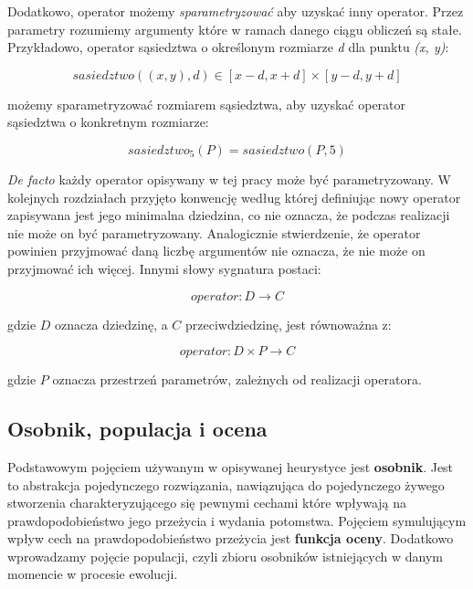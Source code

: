 \documentclass[twoside]{iisthesis}
\newcommand{\Defacto}{\emph{De facto }}
\begin{document}
Dodatkowo, operator możemy \emph{sparametryzować} aby uzyskać inny operator. Przez parametry rozumiemy argumenty które w ramach danego ciągu obliczeń są stałe. Przykładowo, operator sąsiedztwa o określonym rozmiarze \emph{d} dla punktu \emph{(x, y)}:

\begin{displaymath}
	sasiedztwo((x, y), d) \in [x-d, x+d] \times [y-d, y+d]
\end{displaymath}

możemy sparametryzować rozmiarem sąsiedztwa, aby uzyskać operator sąsiedztwa o konkretnym rozmiarze:

\begin{displaymath}
sasiedztwo_5 (P) = sasiedztwo (P, 5)
\end{displaymath}

\Defacto każdy operator opisywany w tej pracy może być parametryzowany. W kolejnych rozdziałach przyjęto konwencję według której definiując nowy operator zapisywana jest jego minimalna dziedzina, co nie oznacza, że podczas realizacji nie może on być parametryzowany. Analogicznie stwierdzenie, że operator powinien przyjmować daną liczbę argumentów nie oznacza, że nie może on przyjmować ich więcej. Innymi słowy sygnatura postaci:

\begin{displaymath}
operator: D \rightarrow C
\end{displaymath}

gdzie $D$ oznacza dziedzinę, a $C$ przeciwdziedzinę, jest równoważna z:

\begin{displaymath}
operator: D \times P \rightarrow C
\end{displaymath}

gdzie $P$ oznacza przestrzeń parametrów, zależnych od realizacji operatora.

\subsection{Osobnik, populacja i ocena}

Podstawowym pojęciem używanym w opisywanej heurystyce jest \textbf{osobnik}. Jest to abstrakcja pojedynczego rozwiązania, nawiązująca do pojedynczego żywego stworzenia charakteryzującego się pewnymi cechami które wpływają na prawdopodobieństwo jego przeżycia i wydania potomstwa. Pojęciem symulującym wpływ cech na prawdopodobieństwo przeżycia jest \textbf{funkcja oceny}. Dodatkowo wprowadzamy pojęcie populacji, czyli zbioru osobników istniejących w danym momencie w procesie ewolucji.
\end{document}
